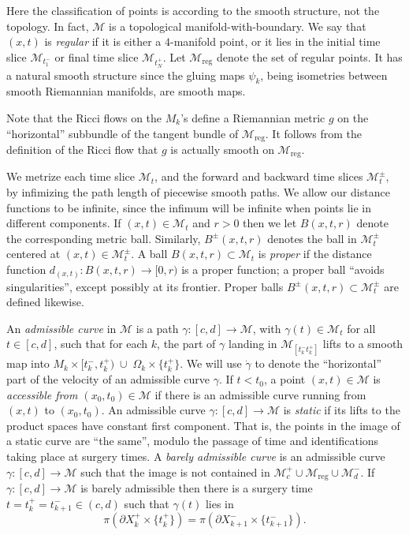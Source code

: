 \documentclass[12pt]{amsart}
\newcommand{\D}{\partial}
\newcommand{\M}{{\mathcal M}}
\newcommand{\Om}{\Omega}
\newcommand{\reg}{\operatorname{reg}}
\newcommand{\ga}{\gamma}
\newcommand{\ra}{\rightarrow}
\numberwithin{equation}{section}
\theoremstyle{plain}
\theoremstyle{definition}
\theoremstyle{remark}
\begin{document}
Here the classification of points is according 
to the smooth structure, not  the topology. In fact, $\M$ is  a topological
manifold-with-boundary.
We say that $(x,t)$ is {\em regular} if it is either a $4$-manifold
point, or it lies in the initial time slice $\M_{t_1^-}$ or final time slice
$\M_{t_N^+}$.
Let  $\M_{\reg}$ denote the set of regular points. It has a natural
smooth structure since the gluing maps $\psi_k$, being isometries
between smooth Riemannian manifolds, are smooth maps.  


Note that the Ricci
flows on the $M_k$'s define a Riemannian metric $g$ on the ``horizontal''
subbundle of the tangent bundle of $\M_{\reg}$.  It follows from the 
definition of the Ricci flow that $g$ is actually smooth on $\M_{\reg}$.


We metrize each time slice $\M_t$, and the forward and backward time
slices $\M_t^\pm$, by infimizing the path length of piecewise smooth paths.
We allow our distance functions to be infinite,
since the infimum will be infinite when points lie in different components.
If $(x,t)\in \M_t$ and $r>0$ then we let $B(x,t,r)$ denote the 
corresponding metric ball. Similarly,  $B^\pm(x,t,r)$ denotes
the ball in $\M_t^\pm$ centered at $(x,t)\in\M_t^\pm$.  
A ball $B(x,t,r)\subset\M_t$ is {\em proper} if the distance
function $d_{(x,t)}:B(x,t,r)\ra [0,r)$ is a proper function;
a proper ball ``avoids singularities'', except possibly at its
frontier.
Proper balls $B^\pm(x,t,r)\subset\M_t^\pm$ are defined likewise.

An {\em admissible curve} in $\M$ is a path $\ga:[c,d]\ra \M$,
with $\ga(t)\in \M_t$ for all $t\in [c,d]$, such that 
for each $k$, the part of $\ga$ landing in $\M_{[t_k^-t_k^+]}$
lifts to a smooth map into 
$M_k\times[t_k^-,t_k^+)\;\cup \;\Om_k\times\{t_k^+\}$.  We will
use $\dot{\ga}$ to denote the ``horizontal'' part of the velocity
of an admissible curve $\ga$.    
If $t < t_0$,
a point $(x,t)\in\M$ is 
{\em accessible from $(x_0,t_0)\in\M$} if there is an admissible curve
running from $(x,t)$ to $(x_0,t_0)$.  An 
admissible curve $\ga:[c,d]\ra\M$ is {\em static} if
its lifts to the product spaces have constant first component. That is,
the points in the image of a  static curve are ``the same'',
modulo the passage of time and identifications taking place
at surgery times.
 A {\em barely
admissible curve} is an admissible curve $\ga:[c,d]\ra\M$
such that the  image is not contained
in $\M_c^+ \cup \M_{\reg}\cup \M_d^-$.
If $\ga:[c,d]\ra\M$ is barely admissible then 
there is a surgery time $t=t_k^+=t_{k+1}^-\in(c,d)$ such that
$\ga(t)$ lies in 
\begin{equation}
\pi(\D X_k^+\times\{t_k^+\})
=\pi(\D X_{k+1}^-\times\{t_{k+1}^-\}).
\end{equation}
\end{document}
